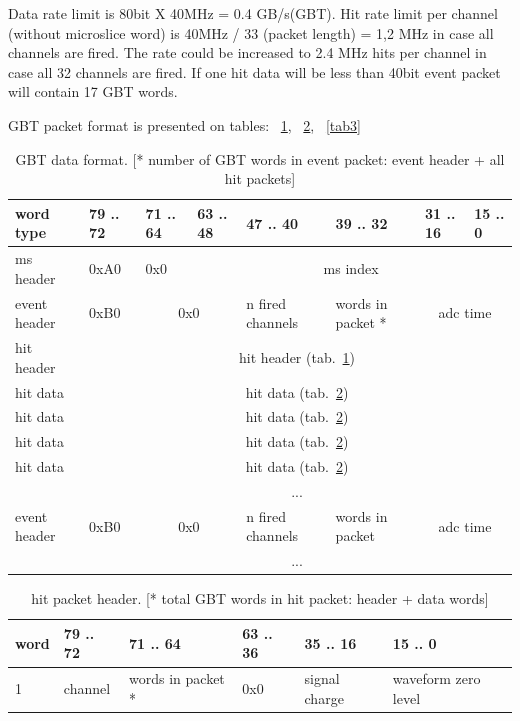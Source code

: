 \documentclass{article}
\begin{document}
Data rate limit is 80bit X 40MHz = 0.4 GB/s(GBT). Hit rate limit per channel (without microslice word) is 40MHz / 33 (packet length) = 1,2 MHz in case all channels are fired. The rate could be increased to  2.4 MHz hits per channel in case all 32 channels are fired. If one hit data will be less than 40bit event packet will contain 17 GBT words.

GBT packet format is presented on tables: ~\ref{tab1}, ~\ref{tab2}, ~\ref{tab3}





\begin{table}[H]
\centering
\begin{tabular}{| l | l | l | l | l | l | l | l |}
\hline
word type & 79 .. 72 & 71 .. 64 & 63 .. 48 & 47 .. 40 & 39 .. 32 & 31 .. 16 & 15 .. 0 \\ \hline
ms header & 0xA0 & 0x0  & \multicolumn{5}{c|}{ms index} \\ \hline
event header & 0xB0 & \multicolumn{2}{c|}{0x0} & n fired channels & words in packet * & \multicolumn{2}{c|}{adc time} \\ \hline
hit header & \multicolumn{7}{c|}{hit header (tab.~\ref{tab1})} \\ \hline
hit data & \multicolumn{7}{c|}{hit data (tab.~\ref{tab2})} \\ \hline
hit data & \multicolumn{7}{c|}{hit data (tab.~\ref{tab2})} \\ \hline
hit data & \multicolumn{7}{c|}{hit data (tab.~\ref{tab2})} \\ \hline
hit data & \multicolumn{7}{c|}{hit data (tab.~\ref{tab2})} \\ \hline
  & \multicolumn{7}{c|}{ ... } \\ \hline

event header & 0xB0 & \multicolumn{2}{c|}{0x0} & n fired channels & words in packet & \multicolumn{2}{c|}{adc time} \\ \hline
  & \multicolumn{7}{c|}{ ... } \\ \hline

\end{tabular}
\caption{GBT data format. [* number of GBT words in event packet: event header + all hit packets]\label{tab1}}
\end{table}

\begin{table}[H]
\centering
\begin{tabular}{| l | l | l | l | l | l |}
\hline
word & 79 .. 72 & 71 .. 64 & 63 .. 36 & 35 .. 16 & 15 .. 0 \\ \hline
1 & channel &words in packet *& 0x0 & signal charge & waveform zero level \\ \hline
\end{tabular}
\caption{hit packet header. [* total GBT words in hit packet: header + data words]\label{tab2}}
\end{table}
\end{document}
